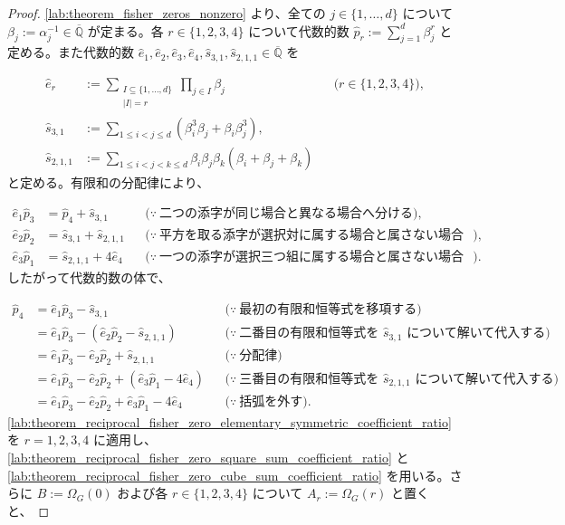 \documentclass[11pt,a4paper]{article}
\theoremstyle{remark}
\begin{document}
\begin{proof}
\cref{lab:theorem_fisher_zeros_nonzero}
 より、全ての
$j\in\{1,\ldots,d\}$
 について
$\beta_j:=\alpha_j^{-1}\in\overline{\mathbb Q}$
 が定まる。各
$r\in\{1,2,3,4\}$
について代数的数
$\widehat p_r:=\sum_{j=1}^{d}\beta_j^r$
と定める。また代数的数
$\widehat e_1,\widehat e_2,\widehat e_3,\widehat e_4,\widehat s_{3,1},\widehat s_{2,1,1}\in\overline{\mathbb Q}$
を

\[\begin{aligned}
\widehat e_r
&:=
\sum_{\substack{I\subseteq\{1,\ldots,d\}\\|I|=r}}
\prod_{j\in I}\beta_j
&&\bigl(r\in\{1,2,3,4\}\bigr),\\
\widehat s_{3,1}
&:=
\sum_{1\le i<j\le d}
\left(\beta_i^3\beta_j+\beta_i\beta_j^3\right),\\
\widehat s_{2,1,1}
&:=
\sum_{1\le i<j<k\le d}
\beta_i\beta_j\beta_k
\left(\beta_i+\beta_j+\beta_k\right)
\end{aligned}\]
と定める。有限和の分配律により、

\[\begin{aligned}
\widehat e_1\widehat p_3
&=\widehat p_4+\widehat s_{3,1}
&&\bigl(\because\ \text{二つの添字が同じ場合と異なる場合へ分ける}\bigr),\\
\widehat e_2\widehat p_2
&=\widehat s_{3,1}+\widehat s_{2,1,1}
&&\bigl(\because\ \text{平方を取る添字が選択対に属する場合と属さない場合へ分ける}\bigr),\\
\widehat e_3\widehat p_1
&=\widehat s_{2,1,1}+4\widehat e_4
&&\bigl(\because\ \text{一つの添字が選択三つ組に属する場合と属さない場合へ分ける}\bigr).
\end{aligned}\]
したがって代数的数の体で、

\[\begin{aligned}
\widehat p_4
&=\widehat e_1\widehat p_3-\widehat s_{3,1}
&&\bigl(\because\ \text{最初の有限和恒等式を移項する}\bigr)\\
&=\widehat e_1\widehat p_3-\left(\widehat e_2\widehat p_2-\widehat s_{2,1,1}\right)
&&\bigl(\because\ \text{二番目の有限和恒等式を }\widehat s_{3,1}\text{ について解いて代入する}\bigr)\\
&=\widehat e_1\widehat p_3-\widehat e_2\widehat p_2+\widehat s_{2,1,1}
&&\bigl(\because\ \text{分配律}\bigr)\\
&=\widehat e_1\widehat p_3-\widehat e_2\widehat p_2+\left(\widehat e_3\widehat p_1-4\widehat e_4\right)
&&\bigl(\because\ \text{三番目の有限和恒等式を }\widehat s_{2,1,1}\text{ について解いて代入する}\bigr)\\
&=\widehat e_1\widehat p_3-\widehat e_2\widehat p_2+\widehat e_3\widehat p_1-4\widehat e_4
&&\bigl(\because\ \text{括弧を外す}\bigr).
\end{aligned}\]
\cref{lab:theorem_reciprocal_fisher_zero_elementary_symmetric_coefficient_ratio}
 を
$r=1,2,3,4$
 に適用し、
\cref{lab:theorem_reciprocal_fisher_zero_square_sum_coefficient_ratio}
 と
\cref{lab:theorem_reciprocal_fisher_zero_cube_sum_coefficient_ratio}
 を用いる。さらに
$B:=\Omega_G(0)$
 および各
$r\in\{1,2,3,4\}$
について
$A_r:=\Omega_G(r)$
と置くと、


\end{proof}
\end{document}
